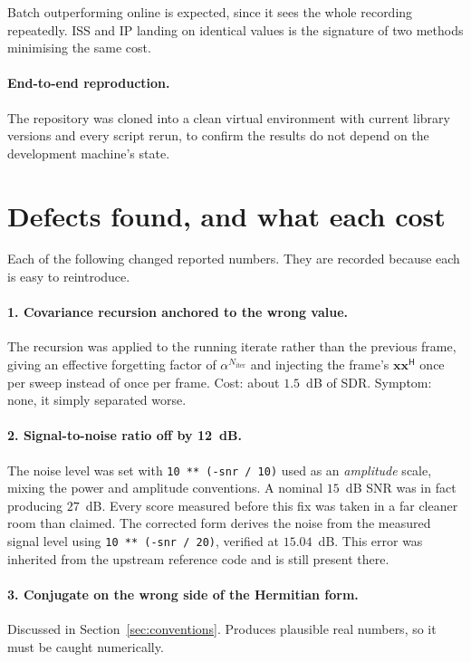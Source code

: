 \documentclass[11pt,a4paper]{article}
\newcommand{\x}{\boldsymbol{x}}
\newcommand{\herm}{^{\mathsf{H}}}
\begin{document}
Batch outperforming online is expected, since it sees the whole recording
repeatedly. ISS and IP landing on identical values is the signature of two
methods minimising the same cost.

\paragraph{End-to-end reproduction.} The repository was cloned into a clean
virtual environment with current library versions and every script rerun, to
confirm the results do not depend on the development machine's state.

\section{Defects found, and what each cost}
\label{sec:pitfalls}

Each of the following changed reported numbers. They are recorded because each
is easy to reintroduce.

\paragraph{1. Covariance recursion anchored to the wrong value.} The recursion
was applied to the running iterate rather than the previous frame, giving an
effective forgetting factor of $\alpha^{N_{\text{iter}}}$ and injecting the
frame's $\x\x\herm$ once per sweep instead of once per frame. Cost: about
$1.5$~dB of SDR. Symptom: none, it simply separated worse.

\paragraph{2. Signal-to-noise ratio off by 12~dB.} The noise level was set with
\verb|10 ** (-snr / 10)| used as an \emph{amplitude} scale, mixing the power and
amplitude conventions. A nominal $15$~dB SNR was in fact producing $27$~dB. Every
score measured before this fix was taken in a far cleaner room than claimed.
The corrected form derives the noise from the measured signal level using
\verb|10 ** (-snr / 20)|, verified at $15.04$~dB. This error was inherited from
the upstream reference code and is still present there.

\paragraph{3. Conjugate on the wrong side of the Hermitian form.} Discussed in
Section~\ref{sec:conventions}. Produces plausible real numbers, so it must be
caught numerically.
\end{document}
